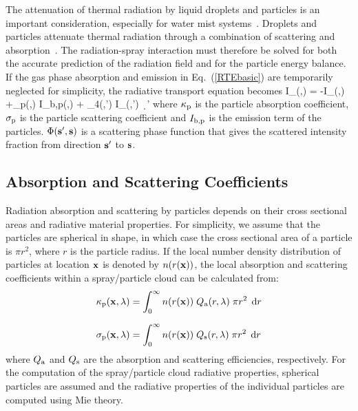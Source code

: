 The attenuation of thermal radiation by liquid droplets and particles is an important consideration, especially for water mist systems~\cite{Ravigururajan:1}.  Droplets and particles attenuate thermal radiation through a combination of scattering and absorption~\cite{Tuntomo:1}.  The radiation-spray interaction must therefore be solved for both the accurate prediction of the radiation field and for the particle energy balance. If the gas phase absorption and emission in Eq.~(\ref{RTEbasic}) are temporarily neglected for simplicity, the radiative transport equation becomes
\be
\bs \cdot \nabla I_{\la}(\bx,\bs) = -
I_{\la}(\bx,\bs) +\kappa_{\rm p}(\bx,\la) \; I_{{\rm b,p}}(\bx,\la) +
\int_{4\pi}\Phi(\bs,\bs') \; I_{\la}(\bx,\bs') \, \d\bs'
\label{RTEspray}
\ee
where $\kappa_{\rm p}$ is the particle absorption coefficient, $\sigma_{\rm p}$ is the particle scattering coefficient and $I_{{\rm b,p}}$ is the emission term of the particles. $\Phi({\mathbf{s}}',{\mathbf{s}})$ is a scattering phase function that gives the scattered intensity fraction from direction ${\mathbf{s}}'$ to ${\mathbf{s}}$.

\subsection{Absorption and Scattering Coefficients}

Radiation absorption and scattering by particles depends on their cross sectional areas and radiative material properties. For simplicity, we assume that the particles are spherical in shape, in which case the cross sectional area of a particle is $\pi r^2$, where $r$ is the particle radius. If the local number density distribution of particles at location ${\mathbf{x}}$ is denoted by $n(r({\mathbf{x}}))$, the local absorption and scattering coefficients within a spray/particle cloud can be calculated from:
\begin{align}
\kappa_{\rm p}(\bx,\la) &= \int_0^\infty n(r(\bx)) \; Q_{\rm a}(r,\la) \; \pi r^2 \; \d r \\[0.1in] %
\sigma_{\rm p}(\bx,\la) &= \int_0^\infty n(r(\bx)) \; Q_{\rm s}(r,\la) \; \pi r^2 \; \d r           %
\end{align}
where $Q_{\rm a}$ and $Q_{\rm s}$ are the absorption and scattering efficiencies, respectively. For the computation of the spray/particle cloud radiative properties, spherical particles are assumed and the radiative properties of the individual particles are computed using Mie theory.

